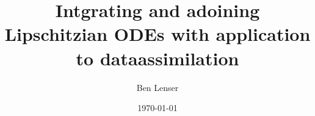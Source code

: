 \documentclass[
	12pt,
	a4paper,
	twoside,
	titlepage,
	parskip=half,
	BCOR=10mm,
	bibliography=totoc,
	headings=normal,
	DIV=calc,
 	draft
]{scrreprt}
\begin{document}
\author{Ben Lenser}
\title{Intgrating and adoining Lipschitzian ODEs with application to dataassimilation}

\date{\today}

  

\cleardoublepage
{}

% 











\begin{spacing}{1}
 \printbibliography
\end{spacing}

\appendix




\end{document}
